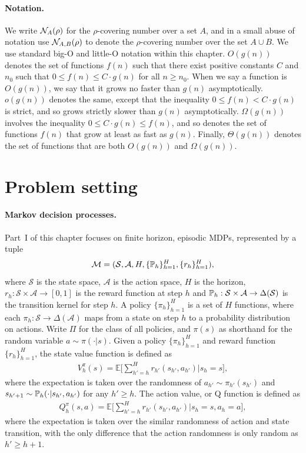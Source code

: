 \paragraph{Notation.} We write ${\mathcal{N}}_A(\rho)$ for the $\rho$-covering number over a set $A$, and in a small abuse of notation use ${\mathcal{N}}_{A,B}(\rho)$ to denote the $\rho$-covering number over the set $A \cup B$. We use standard big-O and little-O notation within this chapter. $O(g(n))$ denotes the set of functions $f(n)$ such that there exist positive constants $C$ and $n_0$ such that $0 \leq f(n) \leq C\cdot g(n)$ for all $n \geq n_0$. When we say a function is $O(g(n))$, we say that it grows no faster than $g(n)$ asymptotically.
$o(g(n))$ denotes the same, except that the inequality $0 \leq f(n) < C\cdot g(n)$ is strict, and so grows strictly slower than $g(n)$ asymptotically. $\Omega(g(n))$ involves the inequality $0 \leq C\cdot g(n) \leq f(n)$, and so denotes the set of functions $f(n)$ that grow at least as fast as $g(n)$. Finally, $\Theta(g(n))$ denotes the set of functions that are both $O(g(n))$ and $\Omega(g(n))$.


\section{Problem setting}
\label{sec:ch04-part1-prelim}




\paragraph{Markov decision processes.}
Part~I of this chapter focuses on finite horizon, episodic MDPs, represented by a tuple
$$\mathcal{M} = (\mathcal{S},\mathcal{A}, H,\{{\mathbb{P}}_h\}_{h=1}^{H} ,\{r_h\}_{h=1}^{H}),$$
where $\mathcal{S}$ is the state space, $\mathcal{A}$ is the action space, $H$ is the horizon, $r_h: \mathcal{S}\times\mathcal{A}\to[0,1]$ is the reward function at step $h$ and ${\mathbb{P}}_h: \mathcal{S}\times\mathcal{A}\to\Delta(\mathcal{S})$ is the transition kernel for step $h$. A policy $\{\pi_h\}_{h=1}^{H}$ is a set of $H$ functions, where each $\pi_h:\mathcal{S}\to\Delta(\mathcal{A})$ maps from a state on step $h$ to a probability distribution on actions. Write $\Pi$ for the class of all policies, and $\pi(s)$ as shorthand for the random variable $a \sim \pi(\cdot | s)$. Given a policy $\{\pi_h\}_{h=1}^{H}$ and reward function $\{r_h\}_{h=1}^{H}$, the state value function is defined as 
\begin{align}
    V_h^{\pi}(s) = \mathbb{E}\bigg[\sum_{h'=h}^{H}r_{h'}(s_{h'},a_{h'})|s_h = s\bigg],
\end{align}
where the expectation is taken over the randomness of $a_{h'}\sim \pi_{h'}(s_{h'})$ and $s_{h'+1}\sim {\mathbb{P}}_h(\cdot|s_{h'},a_{h'})$ for any $h'\geq h$. The action value, or Q function is defined as
\begin{align}
Q_h^{\pi}(s,a) = \mathbb{E}\bigg[\sum_{h'=h}^{H}r_{h'}(s_{h'},a_{h'})|s_h = s,a_h=a\bigg],
\end{align}
where the expectation is taken over the similar randomness of action and state transition, with the only difference that the action randomness is only random as $h'\geq h+1$.

